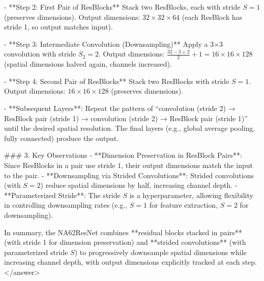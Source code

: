 - **Step 2: First Pair of ResBlocks**  
  Stack two ResBlocks, each with stride \( S = 1 \) (preserves dimensions).  
  Output dimensions: \( 32 \times 32 \times 64 \) (each ResBlock has stride 1, so output matches input).  

- **Step 3: Intermediate Convolution (Downsampling)**  
  Apply a 3×3 convolution with stride \( S_2 = 2 \).  
  Output dimensions: \( \frac{32 - 3 + 2}{2} + 1 = 16 \times 16 \times 128 \) (spatial dimensions halved again, channels increased).  

- **Step 4: Second Pair of ResBlocks**  
  Stack two ResBlocks with stride \( S = 1 \).  
  Output dimensions: \( 16 \times 16 \times 128 \) (preserves dimensions).  

- **Subsequent Layers**: Repeat the pattern of “convolution (stride 2) → ResBlock pair (stride 1) → convolution (stride 2) → ResBlock pair (stride 1)” until the desired spatial resolution. The final layers (e.g., global average pooling, fully connected) produce the output.  


### 3. Key Observations  
- **Dimension Preservation in ResBlock Pairs**: Since ResBlocks in a pair use stride \( 1 \), their output dimensions match the input to the pair.  
- **Downsampling via Strided Convolutions**: Strided convolutions (with \( S = 2 \)) reduce spatial dimensions by half, increasing channel depth.  
- **Parameterized Stride**: The stride \( S \) is a hyperparameter, allowing flexibility in controlling downsampling rates (e.g., \( S = 1 \) for feature extraction, \( S = 2 \) for downsampling).  


In summary, the NA62ResNet combines **residual blocks stacked in pairs** (with stride 1 for dimension preservation) and **strided convolutions** (with parameterized stride \( S \)) to progressively downsample spatial dimensions while increasing channel depth, with output dimensions explicitly tracked at each step.</answer>